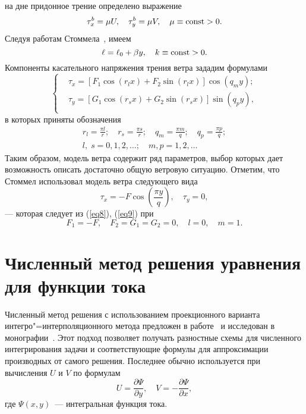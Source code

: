 \documentclass[press]{vestnik}
\begin{document}
на дне придонное трение определено выражение
\begin{equation}
\label{eq6}
\tau_{x}^{b} =\mu U,\quad \tau_{y}^{b} =\mu V,\quad \mu \equiv \mathrm{const}>0.
\end{equation}
Следуя работам Стоммела~\cite{B09,B04,B05}, имеем
\begin{equation}
\label{eq7}
\ell =\ell_{0} +\beta y,\quad k\equiv \mathrm{const}>0.
\end{equation}
Компоненты касательного напряжения трения ветра зададим формулами
\begin{equation}
\label{eq8}
\left\{ {\begin{aligned}
 &\tau_{x} =\left[ {F_{1} \cos (r_{l} x)+F_{2} \sin (r_{l} x)} \right] \cos (q_{m} y); \\ 
 &\tau_{y} =\left[ {G_{1} \cos (r_{s} x)+G_{2} \sin (r_{s} x)} \right] \sin (q_{p} y), \\ 
 \end{aligned}} \right.
\end{equation}
в которых приняты обозначения
\begin{equation}\label{eq9}
\begin{gathered}
 r_{l} =\frac{\pi l}{r};\quad r_{s} =\frac{\pi s}{r};\quad q_{m} =\frac{\pi 
m}{q};\quad q_{p} =\frac{\pi p}{q}; \\ 
 l,\;s=0, 1, 2, \ldots;\quad m, p= 1, 2,\ldots
 \end{gathered}
\end{equation}
Таким образом, модель ветра содержит ряд параметров, выбор которых дает 
возможность описать достаточно общую ветровую ситуацию. Отметим, что Стоммел 
использовал модель ветра следующего вида%
\begin{equation}
\label{eq10}
\tau_{x} =-F \cos \left( {\frac{\pi y}{q}} \right),\quad \tau 
_{y} =0,
\end{equation}
--- которая следует из (\ref{eq8}), (\ref{eq9}) при 
\[
F_{1} =-F,\quad F_{2} =G_{1} =G_{2} =0,\quad l=0,\quad m=1.
\]

\section{Численный метод решения уравнения для функции тока}

Численный метод решения с использованием проекционного варианта 
интегро"=интерполяционного метода предложен в работе~\cite{B12} и исследован в 
монографии~\cite{B13}. Этот подход позволяет получать разностные схемы для 
численного интегрирования задачи и соответствующие формулы для аппроксимации 
производных от самого решения. Последнее обычно используется  при вычисления 
$U$ и $V$ по формулам
\begin{equation}
\label{eq11}
U=\frac{\partial \Psi }{\partial y},\quad V=-\frac{\partial \Psi 
}{\partial x},
\end{equation}
где $\Psi \left( {x,y} \right)$~--- интегральная функция тока.
\end{document}
